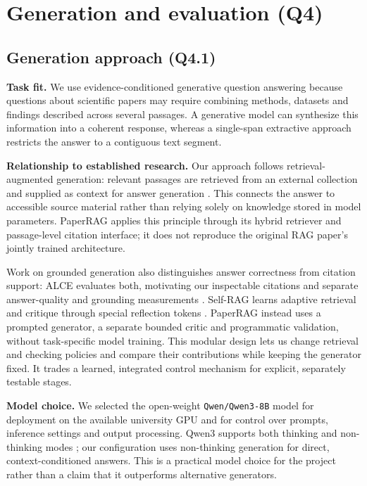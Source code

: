 \section{Generation and evaluation (Q4)}
\subsection{Generation approach (Q4.1)}
\textbf{Task fit.} We use evidence-conditioned generative question answering because questions about scientific papers may require combining methods, datasets and findings described across several passages. A generative model can synthesize this information into a coherent response, whereas a single-span extractive approach restricts the answer to a contiguous text segment.

\textbf{Relationship to established research.} Our approach follows retrieval-augmented generation: relevant passages are retrieved from an external collection and supplied as context for answer generation \citep{lewis2020rag}. This connects the answer to accessible source material rather than relying solely on knowledge stored in model parameters. PaperRAG applies this principle through its hybrid retriever and passage-level citation interface; it does not reproduce the original RAG paper's jointly trained architecture.

Work on grounded generation also distinguishes answer correctness from citation support: ALCE evaluates both, motivating our inspectable citations and separate answer-quality and grounding measurements \citep{gao2023alce}. Self-RAG learns adaptive retrieval and critique through special reflection tokens \citep{asai2023selfrag}. PaperRAG instead uses a prompted generator, a separate bounded critic and programmatic validation, without task-specific model training. This modular design lets us change retrieval and checking policies and compare their contributions while keeping the generator fixed. It trades a learned, integrated control mechanism for explicit, separately testable stages.

\textbf{Model choice.} We selected the open-weight \texttt{Qwen/Qwen3-8B} model for deployment on the available university GPU and for control over prompts, inference settings and output processing. Qwen3 supports both thinking and non-thinking modes \citep{qwen2025}; our configuration uses non-thinking generation for direct, context-conditioned answers. This is a practical model choice for the project rather than a claim that it outperforms alternative generators.

